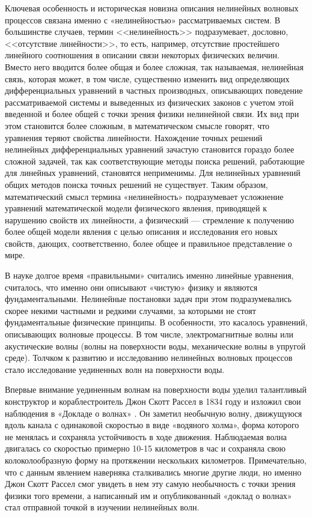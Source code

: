 
Ключевая особенность и историческая новизна описания нелинейных волновых процессов связана именно с «нелинейностью» рассматриваемых систем. В большинстве случаев, термин <<нелинейность>> подразумевает, дословно, <<отсутствие линейности>>, то есть, например, отсутствие простейшего линейного соотношения в описании связи некоторых физических величин. Вместо него вводится более общая и более сложная, так называемая, нелинейная связь, которая может, в том числе, существенно изменить вид определяющих дифференциальных уравнений в частных производных, описывающих поведение рассматриваемой системы и выведенных из физических законов с учетом этой введенной и более общей с точки зрения физики нелинейной связи. Их вид при этом становится более сложным, в математическом смысле говорят, что уравнения теряют свойства линейности. Нахождение точных решений нелинейных дифференциальных уравнений зачастую становится гораздо более сложной задачей, так как соответствующие методы поиска решений, работающие для линейных уравнений, становятся неприменимы. Для нелинейных уравнений общих методов поиска точных решений не существует. Таким образом, математический смысл термина «нелинейность» подразумевает усложнение уравнений математической модели физического явления, приводящей к нарушению свойств их линейности, а физический --- стремление к получению более общей модели явления с целью описания и исследования его новых свойств, дающих, соответственно, более общее и правильное представление о мире.

В науке долгое время «правильными» считались именно линейные уравнения, считалось, что именно они описывают «чистую» физику и являются фундаментальными. Нелинейные постановки задач при этом подразумевались скорее некими частными и редкими случаями, за которыми не стоят фундаментальные физические принципы. В особенности, это касалось уравнений, описывающих волновые процессы. В том числе, электромагнитные волны или акустические волны (волны на поверхности воды, механические волны в упругой среде). Толчком к развитию и исследованию нелинейных волновых процессов стало исследование уединенных волн на поверхности воды.

Впервые внимание уединенным волнам на поверхности воды уделил талантливый конструктор и кораблестроитель Джон Скотт Рассел в 1834 году и изложил свои наблюдения в «Докладе о волнах» \cite{russell1845report}. Он заметил необычную волну, движущуюся вдоль канала с одинаковой скоростью в виде «водяного холма», форма которого не менялась и сохраняла устойчивость в ходе движения. Наблюдаемая волна двигалась со скоростью примерно 10-15 километров в час и сохраняла свою колоколообразную форму на протяжении нескольких километров. Примечательно, что с данным явлением наверняка сталкивались многие другие люди, но именно Джон Скотт Рассел смог увидеть в нем эту самую необычность с точки зрения физики того времени, а написанный им и опубликованный «доклад о волнах» стал отправной точкой в изучении нелинейных волн. 

